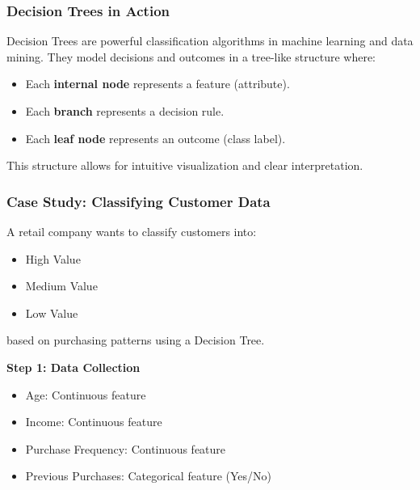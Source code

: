 \documentclass{beamer}
\begin{document}
\begin{frame}[fragile]
    \frametitle{Decision Trees in Action}
    Decision Trees are powerful classification algorithms in machine learning and data mining. They model decisions and outcomes in a tree-like structure where:
    \begin{itemize}
        \item Each \textbf{internal node} represents a feature (attribute).
        \item Each \textbf{branch} represents a decision rule.
        \item Each \textbf{leaf node} represents an outcome (class label).
    \end{itemize}
    This structure allows for intuitive visualization and clear interpretation.
\end{frame}

\begin{frame}[fragile]
    \frametitle{Case Study: Classifying Customer Data}
    A retail company wants to classify customers into:
    \begin{itemize}
        \item High Value
        \item Medium Value
        \item Low Value
    \end{itemize}
    based on purchasing patterns using a Decision Tree.

    \textbf{Step 1: Data Collection}
    \begin{itemize}
        \item Age: Continuous feature
        \item Income: Continuous feature
        \item Purchase Frequency: Continuous feature
        \item Previous Purchases: Categorical feature (Yes/No)
    \end{itemize}
\end{frame}
\end{document}
